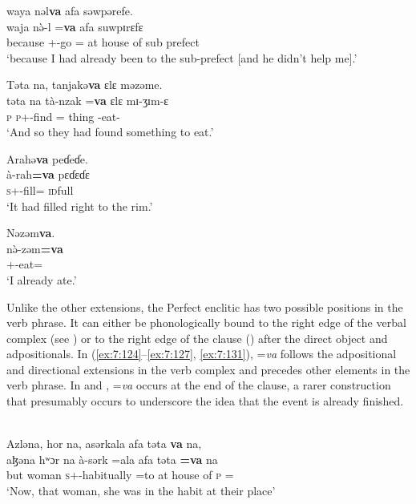       \medskip
waya  nəl\textbf{va} afa səwpərefe.\\
\gll waja  n\`ə-l =\textbf{va} afa suwpɪrɛfɛ\\
     because  {\oneS}+{\PFV}-go     ={\PRF}    {at house of}   {sub prefect}\\
\glt  ‘because I had already been to the sub-prefect [and he didn’t help me].’\\
\z 

\ea\label{ex:7:126}
Təta  na,  tanjakə\textbf{va}  ɛlɛ  məzəme.\\
\gll  təta    na  tà-nzak    =\textbf{va}  ɛlɛ  mɪ-ʒɪm-ɛ\\
      \textsc{p}    {\PSP}  \textsc{p}+{\PFV}-find    ={\PRF}  thing  {\NOM}{}-eat-{\CL}\\
\glt  ‘And so they had found something to eat.’\\
\z 

\ea\label{ex:7:127}
Arahə\textbf{va}  peɗeɗe.\\
\gll  à-rah\textbf{=va}    pɛɗɛɗɛ\\
      \textsc{s}+{\PFV}-fill={\PRF}  \textsc{id}full\\
\glt  ‘It had filled right to the rim.’\\
\z 

\ea\label{ex:7:128}
Nəzəm\textbf{va}.\\
\gll  n\`ə-zəm\textbf{=va}\\
      {\oneS}+{\PFV}-eat={\PRF}\\
\glt  ‘I already ate.’\\
\z 

Unlike the other extensions, the Perfect\textit{ }enclitic has two possible positions in the verb phrase. It can either be phonologically bound to the right edge of the verbal complex (see ) or to the right edge of the clause () after the direct object and adpositionals. In (\ref{ex:7:124}--\ref{ex:7:127}, \ref{ex:7:131}), =\textit{va} follows the adpositional and directional extensions in the verb complex and precedes other elements in the verb phrase. In  and , =\textit{va} occurs at the end of the clause, a rarer construction that presumably occurs to underscore the idea that the event is already finished.

\clearpage
\ea\label{ex:7:129}\\
Azləna,  hor  na,  asərkala  afa  təta \textbf{va}  na,  \\
\gll  aɮəna  hʷɔr     na  à-sərk =ala  afa  təta \textbf{=va} na\\ 
      but  woman  {\PSP}  \textsc{s}+{\PFV}-{habitually} =to  {at house of}  \textsc{p}  ={\PRF} {\PSP} \\  
\glt ‘Now, that woman, she was in the habit at their place’\\
      
